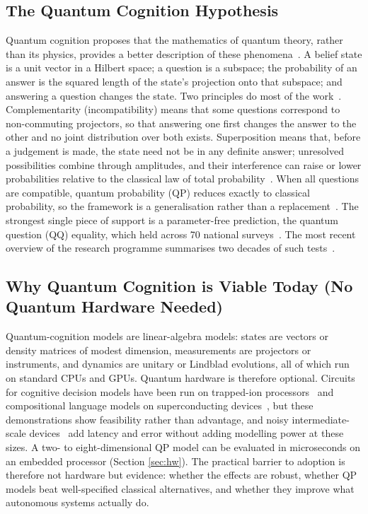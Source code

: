 \documentclass[pdflatex,sn-basic]{sn-jnl}
\begin{document}
\subsection{The Quantum Cognition Hypothesis}\label{sec:hypothesis}
Quantum cognition proposes that the mathematics of quantum theory, rather than its physics, provides a better description of these phenomena~\citep{Busemeyer2012,Pothos2013a,Bruza2015}. A belief state is a unit vector in a Hilbert space; a question is a subspace; the probability of an answer is the squared length of the state's projection onto that subspace; and answering a question changes the state. Two principles do most of the work~\citep{Busemeyer2015}. Complementarity (incompatibility) means that some questions correspond to non-commuting projectors, so that answering one first changes the answer to the other and no joint distribution over both exists. Superposition means that, before a judgement is made, the state need not be in any definite answer; unresolved possibilities combine through amplitudes, and their interference can raise or lower probabilities relative to the classical law of total probability~\citep{Pothos2009}. When all questions are compatible, quantum probability (QP) reduces exactly to classical probability, so the framework is a generalisation rather than a replacement~\citep{Bruza2015}. The strongest single piece of support is a parameter-free prediction, the quantum question (QQ) equality, which held across 70 national surveys~\citep{Wang2013b,Wang2014}. The most recent overview of the research programme summarises two decades of such tests~\citep{Huang2025b}.


\subsection{Why Quantum Cognition is Viable Today (No Quantum Hardware Needed)}\label{sec:viable}
Quantum-cognition models are linear-algebra models: states are vectors or density matrices of modest dimension, measurements are projectors or instruments, and dynamics are unitary or Lindblad evolutions, all of which run on standard CPUs and GPUs. Quantum hardware is therefore optional. Circuits for cognitive decision models have been run on trapped-ion processors~\citep{Widdows2023} and compositional language models on superconducting devices~\citep{Lorenz2023}, but these demonstrations show feasibility rather than advantage, and noisy intermediate-scale devices~\citep{Preskill2018} add latency and error without adding modelling power at these sizes. A two- to eight-dimensional QP model can be evaluated in microseconds on an embedded processor (Section \ref{sec:hw}). The practical barrier to adoption is therefore not hardware but evidence: whether the effects are robust, whether QP models beat well-specified classical alternatives, and whether they improve what autonomous systems actually do.
\end{document}
